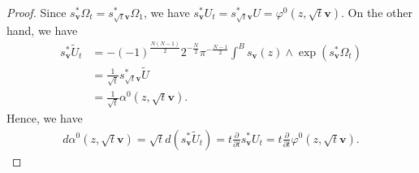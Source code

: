 \documentclass[a4paper,11pt]{amsart} %
\newcommand{\8}{\infty}
\newcommand{\vbf}{\mathbf{v}}
\newcommand{\Util}{\widetilde{U}}
\theoremstyle{mytheoremstyle}
\theoremstyle{remark}
\numberwithin{equation}{section}
\begin{document}
\begin{proof} 
Since $s_\vbf^\ast \Omega_t=s_{\sqrt{t}\vbf}^\ast \Omega_1$,  we have $s_\vbf^\ast U_t=s_{\sqrt{t}\vbf}^\ast U=\varphi^0(z,\sqrt{t}\vbf)$. On the other hand, we have
\begin{align}
s_\vbf^\ast \Util_t & =  -(-1)^{\frac{N(N-1)}{2}}2^{-\frac{N}{2}}\pi^{-\frac{N-1}{2}} \int^B s_\vbf(z)\wedge \exp(s_\vbf^\ast \Omega_t) \nonumber \\
& = \frac{1}{\sqrt{t}} s_{\sqrt{t}\vbf}^\ast \Util \nonumber \\
& = \frac{1}{\sqrt{t}} \alpha^0(z,\sqrt{t}\vbf).
\end{align}
Hence, we have
\begin{align}
d\alpha^0(z,\sqrt{t}\vbf)=\sqrt{t}d(s_\vbf^\ast \Util_t)=t\frac{\partial}{\partial t}s_\vbf^\ast U_t=t\frac{\partial}{\partial t} \varphi^0(z,\sqrt{t}\vbf).
\end{align}
\end{proof}
\end{document}

